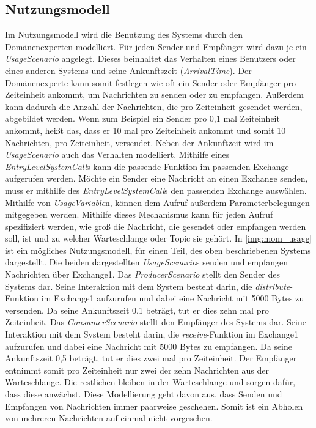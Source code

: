 \subsection{Nutzungsmodell}
Im Nutzungsmodell wird die Benutzung des Systems durch den Domänenexperten modelliert. Für jeden Sender und Empfänger wird dazu je ein \emph{UsageScenario} angelegt. Dieses beinhaltet das Verhalten eines Benutzers oder eines anderen Systems und seine Ankunftszeit (\emph{ArrivalTime}). Der Domänenexperte kann somit festlegen wie oft ein Sender oder Empfänger pro Zeiteinheit ankommt, um Nachrichten zu senden oder zu empfangen. Außerdem kann dadurch die Anzahl der Nachrichten, die pro Zeiteinheit gesendet werden, abgebildet werden. Wenn zum Beispiel ein Sender pro 0,1 mal Zeiteinheit ankommt, heißt das, dass er 10 mal pro Zeiteinheit ankommt und somit 10 Nachrichten, pro Zeiteinheit, versendet. Neben der Ankunftzeit wird im \emph{UsageScenario} auch das Verhalten modelliert. Mithilfe eines \emph{EntryLevelSystemCall}s kann die passende Funktion im passenden Exchange aufgerufen werden. Möchte ein Sender eine Nachricht an einen Exchange senden, muss er mithilfe des \emph{EntryLevelSystemCall}s den passenden Exchange auswählen. Mithilfe von \emph{UsageVariable}n, können dem Aufruf außerdem Parameterbelegungen mitgegeben werden. Mithilfe dieses Mechanismus kann für jeden Aufruf spezifiziert werden, wie groß die Nachricht, die gesendet oder empfangen werden soll, ist und zu welcher Warteschlange oder Topic sie gehört. In \autoref{img:mom_usage} ist ein mögliches Nutzungsmodell, für einen Teil, des oben beschriebenen Systems dargestellt. Die beiden dargestellten \emph{UsageScenario}s senden und empfangen Nachrichten über Exchange1. Das \emph{ProducerScenario} stellt den Sender des Systems dar. Seine Interaktion mit dem System besteht darin, die \emph{distribute}-Funktion im Exchange1 aufzurufen und dabei eine Nachricht mit 5000 Bytes zu versenden. Da seine Ankunftszeit 0,1 beträgt, tut er dies zehn mal pro Zeiteinheit. Das \emph{ConsumerScenario} stellt den Empfänger des Systems dar. Seine Interaktion mit dem System besteht darin, die \emph{receive}-Funktion im Exchange1 aufzurufen und dabei eine Nachricht mit 5000 Bytes zu empfangen. Da seine Ankunftszeit 0,5 beträgt, tut er dies zwei mal pro Zeiteinheit. Der Empfänger entnimmt somit pro Zeiteinheit nur zwei der zehn Nachrichten aus der Warteschlange. Die restlichen bleiben in der Warteschlange und sorgen dafür, dass diese anwächst. Diese Modellierung geht davon aus, dass Senden und Empfangen von Nachrichten immer paarweise geschehen. Somit ist ein Abholen von mehreren Nachrichten auf einmal nicht vorgesehen.
